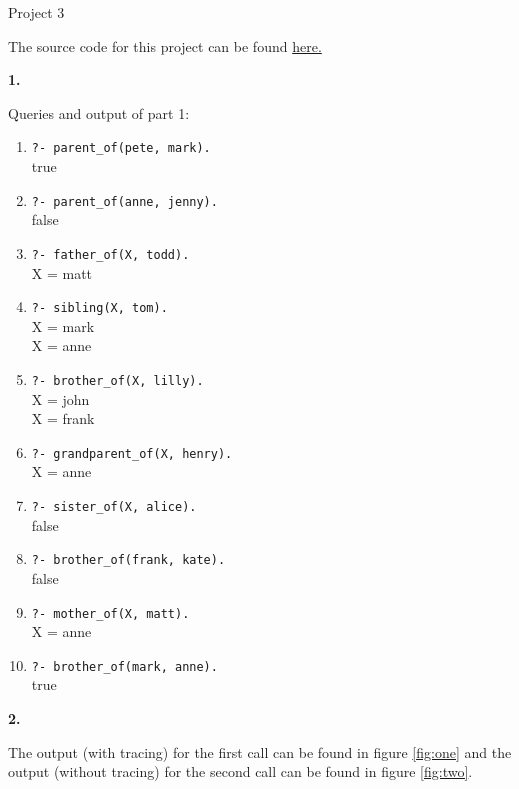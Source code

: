 \documentclass[letterpaper, 11pt]{article}
\newcommand{\hwnumber}[1]{\medskip \noindent\textbf{#1.} \smallskip}
\begin{document}
\begin{center}
	{\LARGE Project 3}\\
\end{center}

The source code for this project can be found 
\href{https://github.com/gwallace04/cs4250/blob/311e0a3d9632a4600a3897c03d33dc0fb7f74519/proj3.txt}{here.}

\hwnumber{1} 

Queries and output of part 1:
\begin{enumerate}[label=(\alph*)]
	\item \texttt{?- parent\_of(pete, mark).} \\ true 
	\item \texttt{?- parent\_of(anne, jenny).} \\ false 
	\item \texttt{?- father\_of(X, todd).} \\ X = matt
	\item \texttt{?- sibling(X, tom).} \\ X = mark \\ X = anne
	\item \texttt{?- brother\_of(X, lilly).} \\ X = john \\ X = frank
	\item \texttt{?- grandparent\_of(X, henry).} \\ X = anne
	\item \texttt{?- sister\_of(X, alice).} \\ false
	\item \texttt{?- brother\_of(frank, kate).} \\ false
	\item \texttt{?- mother\_of(X, matt).} \\ X = anne
	\item \texttt{?- brother\_of(mark, anne).} \\ true
\end{enumerate}

\newpage

\hwnumber{2}

The output (with tracing) for the first call can be found in figure \ref{fig:one} and
the output (without tracing) for the second call can be found in figure \ref{fig:two}.
\end{document}
